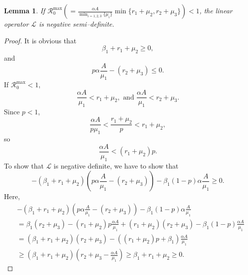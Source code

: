 \documentclass[11pt]{amsart}
\numberwithin{equation}{section}
\theoremstyle{plain}
\newtheorem{lemma}[theorem]{Lemma}
\theoremstyle{definition}
\begin{document}
\begin{lemma}
	If $\mathcal{R}_0^{\max}(=\frac{\alpha A}{\min_{i=1,2,3}\{\mu_i\}}\min\{r_1+\mu_2,r_2+\mu_3\})<1$, the linear operator $\mathcal{L}$ is negative semi--definite.
\end{lemma}
\begin{proof}
	It is obvious that
	\begin{equation*}
		\beta_1+r_1+\mu_2\geq 0,
	\end{equation*}
	and 
	\begin{equation*}
		p \alpha \frac{A}{\mu_1}-(r_2+\mu_3)\leq 0.
	\end{equation*}
	If $\mathcal{R}_0^{\max}<1$,
	\begin{equation*}
		\frac{\alpha A}{\mu_1}<r_1+\mu_2, \text{ and } \frac{\alpha A}{\mu_1}<r_2+\mu_3.
	\end{equation*}
	Since $p<1$, 
	\begin{equation*}
		\frac{\alpha A}{p \mu_1}<\frac{r_1+\mu_2}{p}<r_1+\mu_2,
	\end{equation*}
	so
	\begin{equation*}
		\frac{\alpha A}{\mu_1}<(r_1+\mu_2)p.
	\end{equation*}
	To show that $\mathcal{L}$ is negative definite, we have to show that
	\begin{equation*}
		-(\beta_1+r_1+\mu_2)(p\alpha \frac{A}{\mu_1}-(r_2+\mu_3))-\beta_1(1-p)\alpha\frac{A}{\mu_1}\geq 0.
	\end{equation*}
	Here,
	\begin{equation*}
	\begin{aligned}
		&-(\beta_1+r_1+\mu_2)(p\alpha \frac{A}{\mu_1}-(r_2+\mu_3))-\beta_1(1-p)\alpha\frac{A}{\mu_1}\\
		&=\beta_1(r_2+\mu_3)-(r_1+\mu_2)p\frac{\alpha A}{\mu_1}+(r_1+\mu_2)(r_2+\mu_3)-\beta_1(1-p)\frac{\alpha A}{\mu_1}\\
		&=(\beta_1+r_1+\mu_2)(r_2+\mu_3)-((r_1+\mu_2)p+\beta_1)\frac{\alpha A}{\mu_1}\\
		&\geq (\beta_1+r_1+\mu_2)(r_2+\mu_3-\frac{\alpha A}{\mu_1})\geq \beta_1+r_1+\mu_2\geq 0.
	\end{aligned}
	\end{equation*}
\end{proof}
\end{document}
